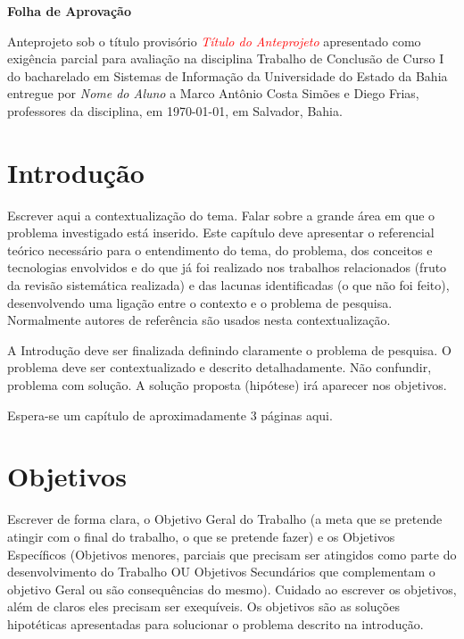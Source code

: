 \documentclass[font=plain]{abnt}
\begin{document}
\capa
\folhaderosto

\begin{folhadeaprovacao}
    \begin{center}
        \large
        \textbf{Folha de Aprovação}
    \end{center}

    Anteprojeto sob o título provisório \textit{\textcolor{red}{Título do Anteprojeto}} apresentado como exigência parcial para avaliação na disciplina Trabalho de Conclusão de Curso I do bacharelado em Sistemas de Informação da Universidade do Estado da Bahia entregue por \textit{Nome do Aluno} a Marco Antônio Costa Simões e Diego Frias, professores da disciplina, em \today, em Salvador, Bahia.
    \setlength{\ABNTsignthickness}{0.4pt}
    \setlength{\ABNTsignskip}{2cm}
    \hspace*{1cm}
    \hspace*{1cm}
\end{folhadeaprovacao}




\sumario


\chapter{Introdução}

Escrever aqui a contextualização do tema. Falar sobre a grande área em que o problema investigado está inserido.  Este capítulo deve apresentar o referencial teórico necessário para o entendimento do tema, do problema,  dos conceitos e tecnologias envolvidos e do que já foi realizado nos trabalhos relacionados (fruto da revisão sistemática realizada) e das lacunas identificadas (o que não foi feito), desenvolvendo uma ligação entre o contexto e o problema de pesquisa.
Normalmente autores de referência são usados nesta contextualização.

A Introdução deve ser finalizada definindo claramente o problema de pesquisa. O problema deve ser contextualizado e descrito detalhadamente. Não confundir, problema com solução. A solução proposta (hipótese) irá aparecer nos objetivos.

Espera-se um capítulo de aproximadamente 3 páginas aqui.

\chapter{Objetivos}
Escrever de forma clara, o Objetivo Geral do Trabalho (a meta que se pretende atingir com o final do trabalho, o que se pretende fazer) e os Objetivos Específicos (Objetivos menores, parciais que precisam ser atingidos como parte do desenvolvimento do Trabalho OU Objetivos Secundários que complementam o objetivo Geral ou são consequências do mesmo). Cuidado ao escrever os objetivos, além de claros eles precisam ser exequíveis. Os objetivos são as soluções hipotéticas apresentadas para solucionar o problema descrito na introdução.
\end{document}
